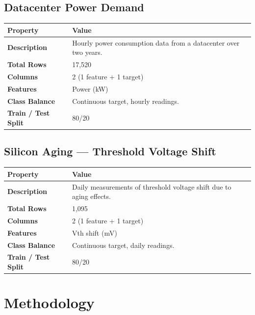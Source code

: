 \documentclass[11pt,a4paper]{article}
\begin{document}
\subsection{Datacenter Power Demand}

\begin{tabularx}{\linewidth}{@{}>{\bfseries}l X @{}}
  \arrayrulecolor{tableheader}
  \toprule
  \rowcolor{tableheader} Property & Value \\
  \midrule
  \rowcolor{white} Description & Hourly power consumption data from a datacenter over two years. \\
  \rowcolor{tablerow} Total Rows & 17,520 \\
  \rowcolor{white} Columns & 2 (1 feature + 1 target) \\
  \rowcolor{tablerow} Features & Power (kW) \\
  \rowcolor{white} Class Balance & Continuous target, hourly readings. \\
  \rowcolor{tablerow} Train / Test Split & 80/20 \\
  \bottomrule
\end{tabularx}

\vspace{6pt}

\subsection{Silicon Aging — Threshold Voltage Shift}

\begin{tabularx}{\linewidth}{@{}>{\bfseries}l X @{}}
  \arrayrulecolor{tableheader}
  \toprule
  \rowcolor{tableheader} Property & Value \\
  \midrule
  \rowcolor{white} Description & Daily measurements of threshold voltage shift due to aging effects. \\
  \rowcolor{tablerow} Total Rows & 1,095 \\
  \rowcolor{white} Columns & 2 (1 feature + 1 target) \\
  \rowcolor{tablerow} Features & Vth shift (mV) \\
  \rowcolor{white} Class Balance & Continuous target, daily readings. \\
  \rowcolor{tablerow} Train / Test Split & 80/20 \\
  \bottomrule
\end{tabularx}

\section{Methodology}
\end{document}
